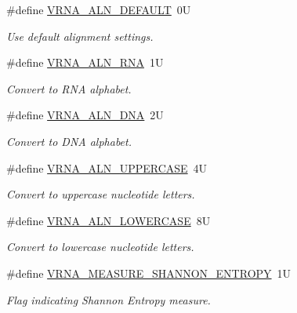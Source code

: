 \begin{DoxyCompactItemize}
\item 
\mbox{\label{group__aln__utils_ga7437bcbc3142b266f1f3b086eb669092}} 
\#define \hyperlink{group__aln__utils_ga7437bcbc3142b266f1f3b086eb669092}{V\+R\+N\+A\+\_\+\+A\+L\+N\+\_\+\+D\+E\+F\+A\+U\+LT}~0U
\begin{DoxyCompactList}\small\item\em Use default alignment settings. \end{DoxyCompactList}\item 
\mbox{\label{group__aln__utils_ga1a2aa60bcc51dc8e48c07bf146bd28c1}} 
\#define \hyperlink{group__aln__utils_ga1a2aa60bcc51dc8e48c07bf146bd28c1}{V\+R\+N\+A\+\_\+\+A\+L\+N\+\_\+\+R\+NA}~1U
\begin{DoxyCompactList}\small\item\em Convert to R\+NA alphabet. \end{DoxyCompactList}\item 
\mbox{\label{group__aln__utils_ga36affc310a5adedf1bdbf9669dd4bf85}} 
\#define \hyperlink{group__aln__utils_ga36affc310a5adedf1bdbf9669dd4bf85}{V\+R\+N\+A\+\_\+\+A\+L\+N\+\_\+\+D\+NA}~2U
\begin{DoxyCompactList}\small\item\em Convert to D\+NA alphabet. \end{DoxyCompactList}\item 
\mbox{\label{group__aln__utils_ga0de72fc917d72acafe862750a3a5e0bc}} 
\#define \hyperlink{group__aln__utils_ga0de72fc917d72acafe862750a3a5e0bc}{V\+R\+N\+A\+\_\+\+A\+L\+N\+\_\+\+U\+P\+P\+E\+R\+C\+A\+SE}~4U
\begin{DoxyCompactList}\small\item\em Convert to uppercase nucleotide letters. \end{DoxyCompactList}\item 
\mbox{\label{group__aln__utils_ga27eb303be3c8368c9e8be76a4d6ca35e}} 
\#define \hyperlink{group__aln__utils_ga27eb303be3c8368c9e8be76a4d6ca35e}{V\+R\+N\+A\+\_\+\+A\+L\+N\+\_\+\+L\+O\+W\+E\+R\+C\+A\+SE}~8U
\begin{DoxyCompactList}\small\item\em Convert to lowercase nucleotide letters. \end{DoxyCompactList}\item 
\#define \hyperlink{group__aln__utils_ga1e659227c9fc077d29989f576f129000}{V\+R\+N\+A\+\_\+\+M\+E\+A\+S\+U\+R\+E\+\_\+\+S\+H\+A\+N\+N\+O\+N\+\_\+\+E\+N\+T\+R\+O\+PY}~1U
\begin{DoxyCompactList}\small\item\em Flag indicating Shannon Entropy measure. \end{DoxyCompactList}\end{DoxyCompactItemize}
